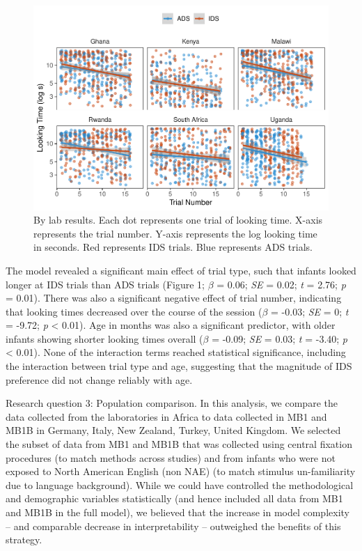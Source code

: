 \documentclass[
  ,man,floatsintext]{apa6}
\begin{document}
\begin{figure}
\centering
\includegraphics{mb1a-paper_files/figure-latex/unnamed-chunk-8-1.pdf}
\caption{\label{fig:unnamed-chunk-8}By lab results. Each dot represents one trial of looking time. X-axis represents the trial number. Y-axis represents the log looking time in seconds. Red represents IDS trials. Blue represents ADS trials.}
\end{figure}

The model revealed a significant main effect of trial type, such that infants looked longer at IDS trials than ADS trials (Figure 1; \emph{\(\beta\)} = 0.06; \emph{SE} = 0.02; \emph{t} = 2.76; \emph{p} = 0.01). There was also a significant negative effect of trial number, indicating that looking times decreased over the course of the session (\emph{\(\beta\)} = -0.03; \emph{SE} = 0; \emph{t} = -9.72; \emph{p} \textless{} 0.01). Age in months was also a significant predictor, with older infants showing shorter looking times overall (\emph{\(\beta\)} = -0.09; \emph{SE} = 0.03; \emph{t} = -3.40; \emph{p} \textless{} 0.01). None of the interaction terms reached statistical significance, including the interaction between trial type and age, suggesting that the magnitude of IDS preference did not change reliably with age.

Research question 3: Population comparison. In this analysis, we compare the data collected from the laboratories in Africa to data collected in MB1 and MB1B in Germany, Italy, New Zealand, Turkey, United Kingdom. We selected the subset of data from MB1 and MB1B that was collected using central fixation procedures (to match methods across studies) and from infants who were not exposed to North American English (non NAE) (to match stimulus un-familiarity due to language background). While we could have controlled the methodological and demographic variables statistically (and hence included all data from MB1 and MB1B in the full model), we believed that the increase in model complexity -- and comparable decrease in interpretability -- outweighed the benefits of this strategy.
\end{document}
